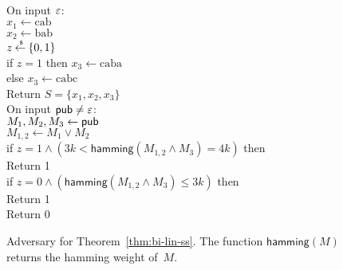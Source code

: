 \begin{figure}[tp]
\centering
{}
{
\\[1ex]
On input $\varepsilon$:\\
\nudge $x_1 \gets \mathrm{cab}$\\
\nudge $x_2 \gets \mathrm{bab}$\\
\nudge $z {\:\stackrel{{\scriptscriptstyle \hspace{0.2em}\$}} {\leftarrow}\:} \{0,1\}$\\
\nudge if $z=1$ then $x_3 \gets \mathrm{caba}$\\
\nudge else $x_3 \gets \mathrm{cabc}$\\
\nudge Return $S=\{x_1,x_2,x_3\}$\\
On input ${\sf pub} \neq \varepsilon$:\\
\nudge $M_1,M_2,M_3 \gets {\sf pub}$\\
\nudge $M_{1,2} \gets M_1 \vee M_2$\\
\nudge if $z=1 \wedge \left(3k < \mathsf{hamming}(M_{1,2} \wedge M_3) = 4k\right)$ then \\
\nudge\nudge Return 1 \\
\nudge if $z=0 \wedge \left(\mathsf{hamming}(M_{1,2} \wedge M_3) \leq 3k\right)$ then \\
\nudge\nudge Return 1 \\
\nudge Return 0
}
\caption{Adversary for Theorem~\ref{thm:bi-lin-ss}. The function $\mathsf{hamming}(M)$ returns the hamming weight of~$M$.}
\label{fig:adv-bi-lin-ss}
\end{figure}

